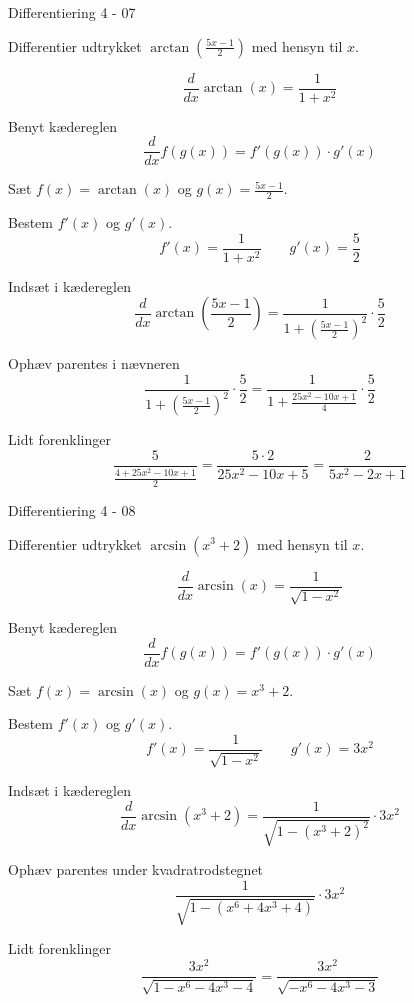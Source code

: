 \documentclass{article}
\begin{document}
\begin{exercise}{Differentiering 4 - 07}

	Differentier udtrykket $\arctan\left( \frac{5 x - 1}{2} \right)$ med hensyn til $x$.
	
	
	\hint
	\[
	\frac{d}{dx} \arctan(x) = \frac{1}{1 + x^ 2}
	\]
	
	
	\hint
	Benyt kædereglen
	\[
	\frac{d}{dx} f(g(x)) = f'(g(x)) \cdot g'(x)
	\]
	
	\hint
	Sæt $f(x) = \arctan(x)$ og $g(x) = \frac{5x - 1}{2}$.
	
	\hint
	Bestem $f'(x)$ og $g'(x)$.
	\[
	f'(x) = \frac{1}{1 + x^ 2} \qquad g'(x) = \frac{5}{2}
	\]
	
	\hint
	Indsæt i kædereglen
	\[
	\frac{d}{dx} \arctan\left( \frac{5x - 1}{2} \right) = \frac{1}{1 + \left( \frac{5x  - 1}{2} \right)^2} \cdot \frac{5}{2}
	\]
	
	\hint
	Ophæv parentes i nævneren
	\[
	\frac{1}{1 + \left( \frac{5x  - 1}{2} \right)^2} \cdot \frac{5}{2} = \frac{1}{1 + \frac{25x^2 - 10 x  + 1}{4}} \cdot \frac{5}{2}
	\]
	
	\hint
	Lidt forenklinger
	\[
	\frac{5}{\frac{4 + 25x^2 - 10 x  + 1}{2}} = \frac{5 \cdot 2}{ 25x^2 - 10 x  + 5} = \frac{2}{5x^2 - 2 x  + 1}  
 	\]
\end{exercise}

\begin{exercise}{Differentiering 4 - 08}
	
	Differentier udtrykket $\arcsin\left( x^3 + 2\right)$ med hensyn til $x$.
	
	
	\hint
	\[
	\frac{d}{dx} \arcsin(x) = \frac{1}{\sqrt{1 - x^2}}
	\]
	
	
	\hint
	Benyt kædereglen
	\[
	\frac{d}{dx} f(g(x)) = f'(g(x)) \cdot g'(x)
	\]
	
	\hint
	Sæt $f(x) = \arcsin(x)$ og $g(x) = x^3 + 2$.
	
	\hint
	Bestem $f'(x)$ og $g'(x)$.
	\[
	f'(x) = \frac{1}{\sqrt{1 - x^2}} \qquad g'(x) = 3x^2
	\]
	
	\hint
	Indsæt i kædereglen
	\[
	\frac{d}{dx} \arcsin\left( x^3 + 2\right) = \frac{1}{\sqrt{1 - \left( x^3 + 2 \right)^2}} \cdot 3x^2
	\]
	
	\hint
	Ophæv parentes under kvadratrodstegnet
	\[
	\frac{1}{\sqrt{1 - (x^6 + 4x^3 + 4)}} \cdot 3x^2
	\]
	
	\hint
	Lidt forenklinger
	\[
	\frac{3x^2}{\sqrt{1 - x^6 - 4x^3 - 4}}  = \frac{3x^2}{\sqrt{-x^6 - 4x^3 - 3}}
	\]
\end{exercise}
\end{document}
